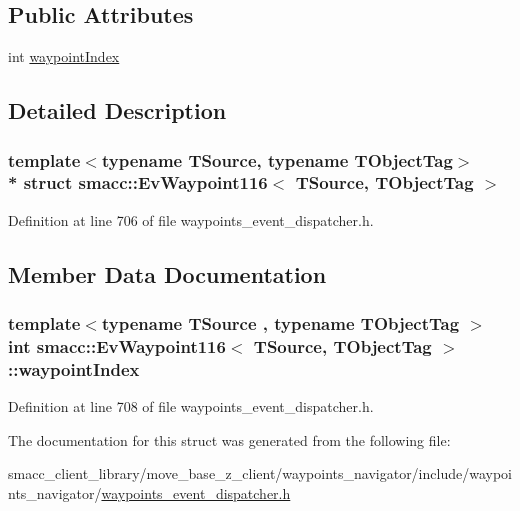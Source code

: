 \subsection*{Public Attributes}
\begin{DoxyCompactItemize}
\item 
int \hyperlink{structsmacc_1_1EvWaypoint116_ad60c17cb1d1acdce56399d6838d9ffc2}{waypoint\+Index}
\end{DoxyCompactItemize}


\subsection{Detailed Description}
\subsubsection*{template$<$typename T\+Source, typename T\+Object\+Tag$>$\\*
struct smacc\+::\+Ev\+Waypoint116$<$ T\+Source, T\+Object\+Tag $>$}



Definition at line 706 of file waypoints\+\_\+event\+\_\+dispatcher.\+h.



\subsection{Member Data Documentation}
\subsubsection[{\texorpdfstring{waypoint\+Index}{waypointIndex}}]{\setlength{\rightskip}{0pt plus 5cm}template$<$typename T\+Source , typename T\+Object\+Tag $>$ int {\bf smacc\+::\+Ev\+Waypoint116}$<$ T\+Source, T\+Object\+Tag $>$\+::waypoint\+Index}\hypertarget{structsmacc_1_1EvWaypoint116_ad60c17cb1d1acdce56399d6838d9ffc2}{}\label{structsmacc_1_1EvWaypoint116_ad60c17cb1d1acdce56399d6838d9ffc2}


Definition at line 708 of file waypoints\+\_\+event\+\_\+dispatcher.\+h.



The documentation for this struct was generated from the following file\+:\begin{DoxyCompactItemize}
\item 
smacc\+\_\+client\+\_\+library/move\+\_\+base\+\_\+z\+\_\+client/waypoints\+\_\+navigator/include/waypoints\+\_\+navigator/\hyperlink{waypoints__event__dispatcher_8h}{waypoints\+\_\+event\+\_\+dispatcher.\+h}\end{DoxyCompactItemize}
